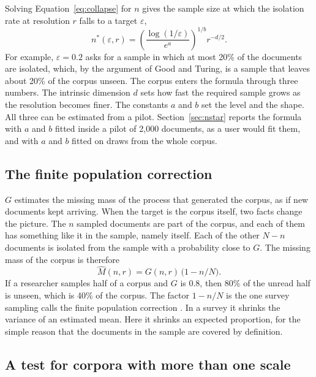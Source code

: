 Solving Equation~\ref{eq:collapse} for $n$ gives the sample size at which the isolation rate at resolution $r$ falls to a target $\varepsilon$,
\begin{equation}
n^{*}(\varepsilon, r) = \left(\frac{\log(1/\varepsilon)}{e^{a}}\right)^{1/b} r^{-d/2} .
\label{eq:nstar}
\end{equation}
For example, $\varepsilon = 0.2$ asks for a sample in which at most 20\% of the documents are isolated, which, by the argument of Good and Turing, is a sample that leaves about 20\% of the corpus unseen. The corpus enters the formula through three numbers. The intrinsic dimension $d$ sets how fast the required sample grows as the resolution becomes finer. The constants $a$ and $b$ set the level and the shape. All three can be estimated from a pilot. Section~\ref{sec:nstar} reports the formula with $a$ and $b$ fitted inside a pilot of 2{,}000 documents, as a user would fit them, and with $a$ and $b$ fitted on draws from the whole corpus.

\subsection{The finite population correction}

$G$ estimates the missing mass of the process that generated the corpus, as if new documents kept arriving. When the target is the corpus itself, two facts change the picture. The $n$ sampled documents are part of the corpus, and each of them has something like it in the sample, namely itself. Each of the other $N - n$ documents is isolated from the sample with a probability close to $G$. The missing mass of the corpus is therefore
\begin{equation}
\hat M(n, r) = G(n, r)\,\big(1 - n/N\big).
\label{eq:fpc}
\end{equation}
If a researcher samples half of a corpus and $G$ is 0.8, then 80\% of the unread half is unseen, which is 40\% of the corpus. The factor $1 - n/N$ is the one survey sampling calls the finite population correction \citep{groves2009survey}. In a survey it shrinks the variance of an estimated mean. Here it shrinks an expected proportion, for the simple reason that the documents in the sample are covered by definition.

\subsection{A test for corpora with more than one scale}

